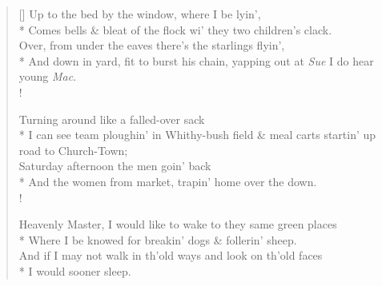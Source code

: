 \documentclass[MAIN]{subfiles}
\begin{document}
\settowidth{\versewidth}{\vin Comes bells \& bleat of the flock wi' they two children's clack.}
\begin{verse}[\versewidth]
Up to the bed by the window, where I be lyin',\\* 
\vin Comes bells \& bleat of the flock wi' they two children's clack.\\
Over, from under the eaves there's the starlings flyin',\\*
\vin And down in yard, fit to burst his chain, yapping out at \emph{Sue} I do hear young \emph{Mac}.\\!

Turning around like a falled-over sack\\*
\vin I can see team ploughin' in {\sc Whithy-bush} field \& meal carts startin' up road to {\sc Church-Town};\\
Saturday afternoon the men goin' back\\*
\vin And the women from market, trapin' home over the down.\\!

Heavenly Master, I would like to wake to they same green places\\*
\vin Where I be knowed for breakin' dogs \& follerin' sheep.\\
And if I may not walk in th'old ways and look on th'old faces\\*
\vin I would sooner sleep.
\end{verse}
\end{document}
